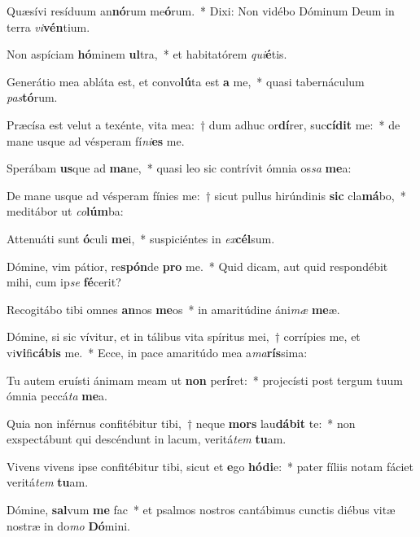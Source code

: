\item Quæsívi resíduum an\textbf{nó}rum me\textbf{ó}rum.~* Dixi: Non vidébo Dóminum Deum in terra \textit{vi}\textbf{vén}tium.
\item Non aspíciam \textbf{hó}minem \textbf{ul}tra,~* et habitatórem \textit{qui}\textbf{é}tis.
\item Generátio mea abláta est, et convo\textbf{lú}ta est \textbf{a} me,~* quasi tabernáculum \textit{pas}\textbf{tó}rum.
\item Præcísa est velut a texénte, vita mea:~† dum adhuc or\textbf{dí}rer, suc\textbf{cí}\textbf{dit} me:~* de mane usque ad vésperam fí\textit{ni}\textbf{es} me.
\item Sperábam \textbf{us}que ad \textbf{ma}ne,~* quasi leo sic contrívit ómnia os\textit{sa} \textbf{me}a:
\item De mane usque ad vésperam fínies me:~† sicut pullus hirúndinis \textbf{sic} cla\textbf{má}bo,~* meditábor ut \textit{co}\textbf{lúm}ba:
\item Attenuáti sunt \textbf{ó}culi \textbf{me}i,~* suspiciéntes in \textit{ex}\textbf{cél}sum.
\item Dómine, vim pátior, re\textbf{spón}de \textbf{pro} me.~* Quid dicam, aut quid respondébit mihi, cum ip\textit{se} \textbf{fé}cerit?
\item Recogitábo tibi omnes \textbf{an}nos \textbf{me}os~* in amaritúdine áni\textit{mæ} \textbf{me}æ.
\item Dómine, si sic vívitur, et in tálibus vita spíritus mei,~† corrípies me, et vi\textbf{vi}fi\textbf{cá}\textbf{bis} me.~* Ecce, in pace amaritúdo mea a\textit{ma}\textbf{rís}sima:
\item Tu autem eruísti ánimam meam ut \textbf{non} per\textbf{í}ret:~* projecísti post tergum tuum ómnia peccá\textit{ta} \textbf{me}a.
\item Quia non inférnus confitébitur tibi,~† neque \textbf{mors} lau\textbf{dá}\textbf{bit} te:~* non exspectábunt qui descéndunt in lacum, veritá\textit{tem} \textbf{tu}am.
\item Vivens vivens ipse confitébitur tibi, sicut et \textbf{e}go \textbf{hó}\textbf{di}e:~* pater fíliis notam fáciet veritá\textit{tem} \textbf{tu}am.
\item Dómine, \textbf{sal}vum \textbf{me} fac~* et psalmos nostros cantábimus cunctis diébus vitæ nostræ in do\textit{mo} \textbf{Dó}mini.
